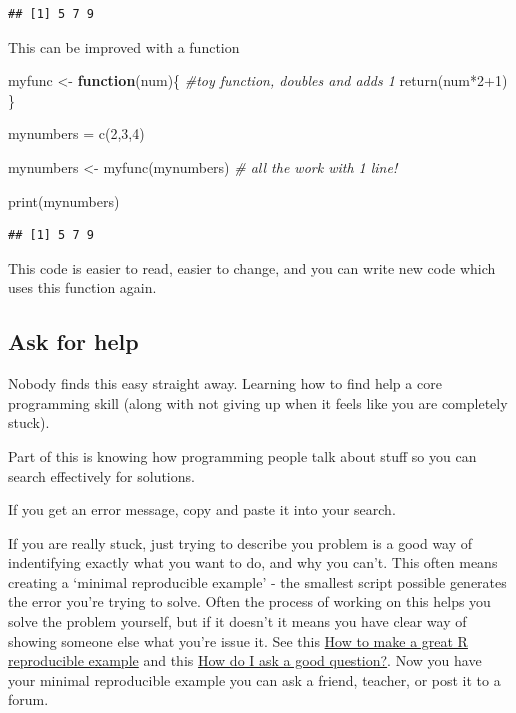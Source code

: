 \documentclass[
]{book}
\newenvironment{Shaded}{\begin{snugshade}}{\end{snugshade}}
\newcommand{\CommentTok}[1]{\textcolor[rgb]{0.56,0.35,0.01}{\textit{#1}}}
\newcommand{\ControlFlowTok}[1]{\textcolor[rgb]{0.13,0.29,0.53}{\textbf{#1}}}
\newcommand{\DecValTok}[1]{\textcolor[rgb]{0.00,0.00,0.81}{#1}}
\newcommand{\FunctionTok}[1]{\textcolor[rgb]{0.00,0.00,0.00}{#1}}
\newcommand{\NormalTok}[1]{#1}
\newcommand{\OtherTok}[1]{\textcolor[rgb]{0.56,0.35,0.01}{#1}}
\newcommand{\SpecialCharTok}[1]{\textcolor[rgb]{0.00,0.00,0.00}{#1}}
\begin{document}
\begin{verbatim}
## [1] 5 7 9
\end{verbatim}

This can be improved with a function

\begin{Shaded}
\begin{Highlighting}[]
\NormalTok{myfunc }\OtherTok{\textless{}{-}} \ControlFlowTok{function}\NormalTok{(num)\{}
  \CommentTok{\#toy function, doubles and adds 1}
  \FunctionTok{return}\NormalTok{(num}\SpecialCharTok{*}\DecValTok{2}\SpecialCharTok{+}\DecValTok{1}\NormalTok{)}
\NormalTok{  \}  }

\NormalTok{mynumbers }\OtherTok{=} \FunctionTok{c}\NormalTok{(}\DecValTok{2}\NormalTok{,}\DecValTok{3}\NormalTok{,}\DecValTok{4}\NormalTok{)}

\NormalTok{mynumbers }\OtherTok{\textless{}{-}} \FunctionTok{myfunc}\NormalTok{(mynumbers) }\CommentTok{\# all the work with 1 line!}

\FunctionTok{print}\NormalTok{(mynumbers)}
\end{Highlighting}
\end{Shaded}

\begin{verbatim}
## [1] 5 7 9
\end{verbatim}

This code is easier to read, easier to change, and you can write new code which uses this function again.

\hypertarget{ask-for-help}{%
\subsection{Ask for help}\label{ask-for-help}}

Nobody finds this easy straight away. Learning how to find help a core programming skill (along with not giving up when it feels like you are completely stuck).

Part of this is knowing how programming people talk about stuff so you can search effectively for solutions.

If you get an error message, copy and paste it into your search.

If you are really stuck, just trying to describe you problem is a good way of indentifying exactly what you want to do, and why you can't. This often means creating a `minimal reproducible example' - the smallest script possible generates the error you're trying to solve. Often the process of working on this helps you solve the problem yourself, but if it doesn't it means you have clear way of showing someone else what you're issue it. See this \href{https://stackoverflow.com/questions/5963269/how-to-make-a-great-r-reproducible-example}{How to make a great R reproducible example} and this \href{https://stackoverflow.com/help/how-to-ask}{How do I ask a good question?}. Now you have your minimal reproducible example you can ask a friend, teacher, or post it to a forum.
\end{document}
